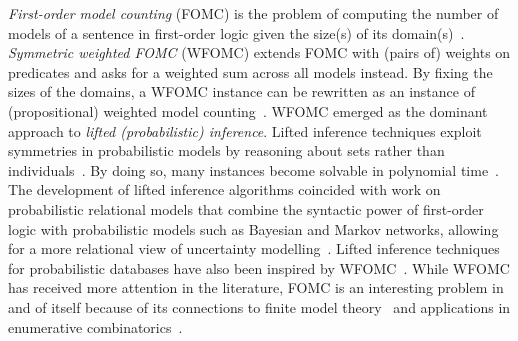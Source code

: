 \documentclass{article}
\begin{document}

\emph{First-order model counting} (FOMC) is the problem of computing the number
of models of a sentence in first-order logic given the size(s) of its
domain(s)~\cite{DBLP:conf/pods/BeameBGS15}. \emph{Symmetric weighted FOMC}
(WFOMC) extends FOMC with (pairs of) weights on predicates and asks for a
weighted sum across all models instead. By fixing the sizes of the domains, a
WFOMC instance can be rewritten as an instance of (propositional) weighted model
counting~\cite{DBLP:journals/ai/ChaviraD08}. WFOMC emerged as the dominant
approach to \emph{lifted (probabilistic) inference}. Lifted inference techniques
exploit symmetries in probabilistic models by reasoning about sets rather than
individuals~\cite{DBLP:conf/ecai/Kersting12}. By doing so, many instances become
solvable in polynomial time~\cite{DBLP:conf/nips/Broeck11}. The development of
lifted inference algorithms coincided with work on probabilistic relational
models that combine the syntactic power of first-order logic with probabilistic
models such as Bayesian and Markov networks, allowing for a more relational view
of uncertainty
modelling~\cite{DBLP:series/synthesis/2016Raedt,DBLP:journals/ml/KimmigMG15,DBLP:journals/ml/RichardsonD06}.
Lifted inference techniques for probabilistic databases have also been inspired
by
WFOMC~\cite{DBLP:journals/pvldb/GatterbauerS15,DBLP:journals/debu/GribkoffSB14}.
While WFOMC has received more attention in the literature, FOMC is an
interesting problem in and of itself because of its connections to finite model
theory~\cite{DBLP:conf/kr/BremenK21} and applications in enumerative
combinatorics~\cite{DBLP:conf/ilp/BarvinekB0ZK21}.


\end{document}
